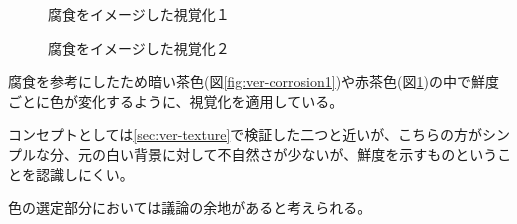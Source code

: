 \begin{figure}[htbp]
  \begin{minipage}{0.5\hsize}
    \begin{center}
    \end{center}
    \caption{腐食をイメージした視覚化１}
    \label{fig:ver-corrosion1}
  \end{minipage}
  \begin{minipage}{0.5\hsize}
    \begin{center}
    \end{center}
    \caption{腐食をイメージした視覚化２}
    \label{fig:ver-corrosion2}
  \end{minipage}
\end{figure}

腐食を参考にしたため暗い茶色(図\ref{fig:ver-corrosion1})や赤茶色(図\ref{fig:ver-corrosion2})の中で鮮度ごとに色が変化するように、視覚化を適用している。

コンセプトとしては\ref{sec:ver-texture}で検証した二つと近いが、こちらの方がシンプルな分、元の白い背景に対して不自然さが少ないが、鮮度を示すものということを認識しにくい。

色の選定部分においては議論の余地があると考えられる。

